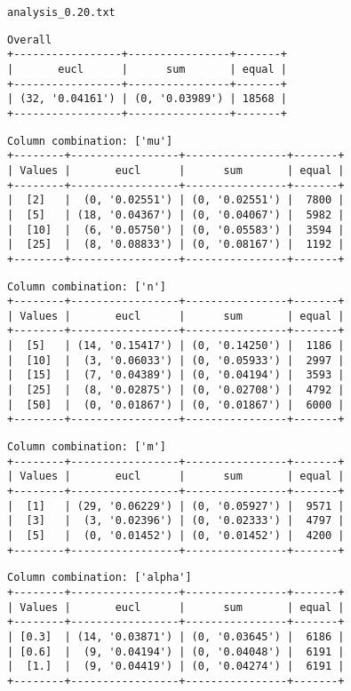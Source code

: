 \documentclass{article}
\begin{document}
\begin{verbatim}

\end{verbatim}

\newpage
\verb|analysis_0.20.txt|
\begin{verbatim}
Overall
+-----------------+----------------+-------+
|       eucl      |      sum       | equal |
+-----------------+----------------+-------+
| (32, '0.04161') | (0, '0.03989') | 18568 |
+-----------------+----------------+-------+
\end{verbatim}

\begin{verbatim}
Column combination: ['mu']
+--------+-----------------+----------------+-------+
| Values |       eucl      |      sum       | equal |
+--------+-----------------+----------------+-------+
|  [2]   |  (0, '0.02551') | (0, '0.02551') |  7800 |
|  [5]   | (18, '0.04367') | (0, '0.04067') |  5982 |
|  [10]  |  (6, '0.05750') | (0, '0.05583') |  3594 |
|  [25]  |  (8, '0.08833') | (0, '0.08167') |  1192 |
+--------+-----------------+----------------+-------+
\end{verbatim}

\begin{verbatim}
Column combination: ['n']
+--------+-----------------+----------------+-------+
| Values |       eucl      |      sum       | equal |
+--------+-----------------+----------------+-------+
|  [5]   | (14, '0.15417') | (0, '0.14250') |  1186 |
|  [10]  |  (3, '0.06033') | (0, '0.05933') |  2997 |
|  [15]  |  (7, '0.04389') | (0, '0.04194') |  3593 |
|  [25]  |  (8, '0.02875') | (0, '0.02708') |  4792 |
|  [50]  |  (0, '0.01867') | (0, '0.01867') |  6000 |
+--------+-----------------+----------------+-------+
\end{verbatim}

\begin{verbatim}
Column combination: ['m']
+--------+-----------------+----------------+-------+
| Values |       eucl      |      sum       | equal |
+--------+-----------------+----------------+-------+
|  [1]   | (29, '0.06229') | (0, '0.05927') |  9571 |
|  [3]   |  (3, '0.02396') | (0, '0.02333') |  4797 |
|  [5]   |  (0, '0.01452') | (0, '0.01452') |  4200 |
+--------+-----------------+----------------+-------+
\end{verbatim}

\begin{verbatim}
Column combination: ['alpha']
+--------+-----------------+----------------+-------+
| Values |       eucl      |      sum       | equal |
+--------+-----------------+----------------+-------+
| [0.3]  | (14, '0.03871') | (0, '0.03645') |  6186 |
| [0.6]  |  (9, '0.04194') | (0, '0.04048') |  6191 |
|  [1.]  |  (9, '0.04419') | (0, '0.04274') |  6191 |
+--------+-----------------+----------------+-------+
\end{verbatim}
\end{document}
